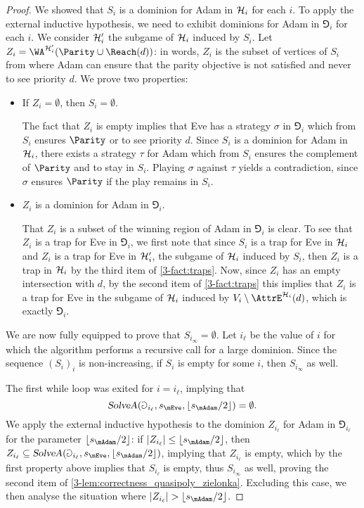 \begin{proof}
We showed that $S_i$ is a dominion for Adam in $\mathcal{H}_i$ for each $i$.
To apply the external inductive hypothesis, we need to exhibit dominions for Adam in $\Game_i$ for each $i$.
We consider $\mathcal{H}'_i$ the subgame of $\mathcal{H}_i$ induced by $S_i$.
Let $Z_i = \WA^{\H'_i}(\Parity \cup \Reach(d))$: 
in words, $Z_i$ is the subset of vertices of $S_i$ from where Adam can ensure that the parity objective is not satisfied
and never to see priority $d$.
We prove two properties:
\begin{itemize}
	\item If $Z_i = \emptyset$, then $S_i = \emptyset$.

The fact that $Z_i$ is empty implies that Eve has a strategy $\sigma$ in $\Game_i$ which from $S_i$ ensures $\Parity$ or to see priority $d$.
Since $S_i$ is a dominion for Adam in $\mathcal{H}_i$, there exists a strategy $\tau$ for Adam which from $S_i$ ensures the complement of $\Parity$
and to stay in $S_i$. 
Playing $\sigma$ against $\tau$ yields a contradiction, since $\sigma$ ensures $\Parity$ if the play remains in $S_i$.

	\item $Z_i$ is a dominion for Adam in $\Game_i$.

That $Z_i$ is a subset of the winning region of Adam in $\Game_i$ is clear.
To see that $Z_i$ is a trap for Eve in $\Game_i$, we first note that since $S_i$ is a trap for Eve in $\mathcal{H}_i$
and $Z_i$ is a trap for Eve in $\mathcal{H}'_i$, the subgame of $\mathcal{H}_i$ induced by $S_i$, 
then $Z_i$ is a trap in $\mathcal{H}_i$ by the third item of \cref{3-fact:traps}.
Now, since $Z_i$ has an empty intersection with $d$, by the second item of \cref{3-fact:traps} 
this implies that $Z_i$ is a trap for Eve in the subgame of $\mathcal{H}_i$ induced by $V_i \setminus \AttrE^{\H_i}(d)$,
which is exactly $\Game_i$.
\end{itemize}

We are now fully equipped to prove that $S_{i_{\infty}} = \emptyset$.
Let $i_{\ell}$ be the value of $i$ for which the algorithm performs a recursive call for a large dominion.
Since the sequence $(S_i)_i$ is non-increasing, if $S_i$ is empty for some $i$, then $S_{i_{\infty}}$ as well.

The first while loop was exited for $i = i_{\ell}$, implying that 
\[
\textsl{SolveA}(\Game_{i_{\ell}},s_{\mEve},\lfloor s_{\mAdam} / 2 \rfloor) = \emptyset.
\]
We apply the external inductive hypothesis to the dominion $Z_{i_{\ell}}$ for Adam in $\Game_{i_{\ell}}$
for the parameter $\lfloor s_{\mAdam} / 2 \rfloor$: if $|Z_{i_{\ell}}| \le \lfloor s_{\mAdam} / 2 \rfloor$, then
$Z_{i_{\ell}} \subseteq \textsl{SolveA}(\Game_{i_{\ell}},s_{\mEve},\lfloor s_{\mAdam} / 2 \rfloor)$,
implying that $Z_{i_{\ell}}$ is empty, which by the first property above implies that $S_{i_{\ell}}$ is empty,
thus $S_{i_{\infty}}$ as well, proving the second item of \cref{3-lem:correctness_quasipoly_zielonka}.
Excluding this case, we then analyse the situation where 
$|Z_{i_{\ell}}| > \lfloor s_{\mAdam} / 2 \rfloor$. 


\end{proof}
